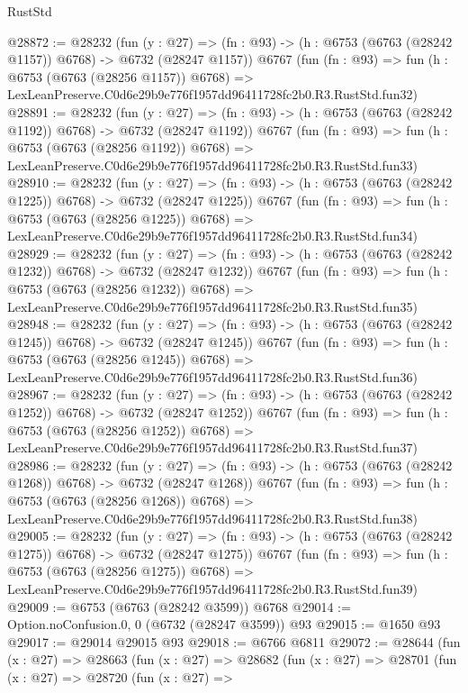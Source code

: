\begin{lexlean}{RustStd}
\begin{coremodule}
@28872 := @28232
    (fun (y : @27) =>
    (fn : @93) -> (h : @6753 (@6763 (@28242 @1157)) @6768) -> @6732 (@28247 @1157))
    @6767
    (fun (fn : @93) =>
    fun (h : @6753 (@6763 (@28256 @1157)) @6768) =>
    LexLeanPreserve.C0d6e29b9e776f1957dd96411728fc2b0.R3.RustStd.fun32)
@28891 := @28232
    (fun (y : @27) =>
    (fn : @93) -> (h : @6753 (@6763 (@28242 @1192)) @6768) -> @6732 (@28247 @1192))
    @6767
    (fun (fn : @93) =>
    fun (h : @6753 (@6763 (@28256 @1192)) @6768) =>
    LexLeanPreserve.C0d6e29b9e776f1957dd96411728fc2b0.R3.RustStd.fun33)
@28910 := @28232
    (fun (y : @27) =>
    (fn : @93) -> (h : @6753 (@6763 (@28242 @1225)) @6768) -> @6732 (@28247 @1225))
    @6767
    (fun (fn : @93) =>
    fun (h : @6753 (@6763 (@28256 @1225)) @6768) =>
    LexLeanPreserve.C0d6e29b9e776f1957dd96411728fc2b0.R3.RustStd.fun34)
@28929 := @28232
    (fun (y : @27) =>
    (fn : @93) -> (h : @6753 (@6763 (@28242 @1232)) @6768) -> @6732 (@28247 @1232))
    @6767
    (fun (fn : @93) =>
    fun (h : @6753 (@6763 (@28256 @1232)) @6768) =>
    LexLeanPreserve.C0d6e29b9e776f1957dd96411728fc2b0.R3.RustStd.fun35)
@28948 := @28232
    (fun (y : @27) =>
    (fn : @93) -> (h : @6753 (@6763 (@28242 @1245)) @6768) -> @6732 (@28247 @1245))
    @6767
    (fun (fn : @93) =>
    fun (h : @6753 (@6763 (@28256 @1245)) @6768) =>
    LexLeanPreserve.C0d6e29b9e776f1957dd96411728fc2b0.R3.RustStd.fun36)
@28967 := @28232
    (fun (y : @27) =>
    (fn : @93) -> (h : @6753 (@6763 (@28242 @1252)) @6768) -> @6732 (@28247 @1252))
    @6767
    (fun (fn : @93) =>
    fun (h : @6753 (@6763 (@28256 @1252)) @6768) =>
    LexLeanPreserve.C0d6e29b9e776f1957dd96411728fc2b0.R3.RustStd.fun37)
@28986 := @28232
    (fun (y : @27) =>
    (fn : @93) -> (h : @6753 (@6763 (@28242 @1268)) @6768) -> @6732 (@28247 @1268))
    @6767
    (fun (fn : @93) =>
    fun (h : @6753 (@6763 (@28256 @1268)) @6768) =>
    LexLeanPreserve.C0d6e29b9e776f1957dd96411728fc2b0.R3.RustStd.fun38)
@29005 := @28232
    (fun (y : @27) =>
    (fn : @93) -> (h : @6753 (@6763 (@28242 @1275)) @6768) -> @6732 (@28247 @1275))
    @6767
    (fun (fn : @93) =>
    fun (h : @6753 (@6763 (@28256 @1275)) @6768) =>
    LexLeanPreserve.C0d6e29b9e776f1957dd96411728fc2b0.R3.RustStd.fun39)
@29009 := @6753 (@6763 (@28242 @3599)) @6768
@29014 := Option.noConfusion.{0, 0} (@6732 (@28247 @3599)) @93
@29015 := @1650 @93
@29017 := @29014 @29015 @93
@29018 := @6766 @6811
@29072 := @28644
    (fun (x : @27) =>
    @28663
      (fun (x : @27) =>
      @28682
        (fun (x : @27) =>
        @28701
          (fun (x : @27) =>
          @28720
            (fun (x : @27) =>

\end{coremodule}
\end{lexlean}
